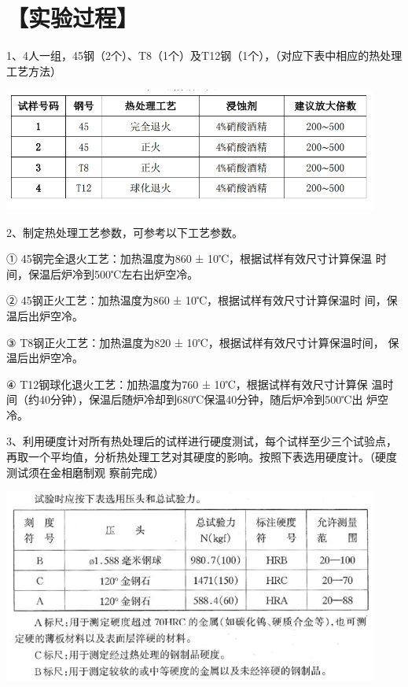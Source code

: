 \documentclass[a4paper,utf8]{article}
\begin{document}
\section*{【实验过程】}%
1、4人一组，45钢（2个）、T8（1个）及T12钢（1个），（对应下表中相应的热处理工艺方法）

\begin{center}
    \includegraphics[width=350pt]{3.png}
\end{center}

2、制定热处理工艺参数，可参考以下工艺参数。

① 45钢完全退火工艺：加热温度为860 ± 10℃，根据试样有效尺寸计算保温
时间，保温后炉冷到500℃左右出炉空冷。

② 45钢正火工艺：加热温度为860 ± 10℃，根据试样有效尺寸计算保温时
间，保温后出炉空冷。

③ T8钢正火工艺：加热温度为820 ± 10℃，根据试样有效尺寸计算保温时间，
保温后出炉空冷。

④ T12钢球化退火工艺：加热温度为760 ± 10℃，根据试样有效尺寸计算保
温时间（约40分钟），保温后随炉冷却到680℃保温40分钟，随后炉冷到500℃出
炉空冷。

3、利用硬度计对所有热处理后的试样进行硬度测试，每个试样至少三个试验点，再取一个平均值，分析热处理工艺对其硬度的影响。按照下表选用硬度计。（硬度测试须在金相磨制观
察前完成）

\begin{center}
    \includegraphics[width=350pt]{4.png}
\end{center}
\end{document}
